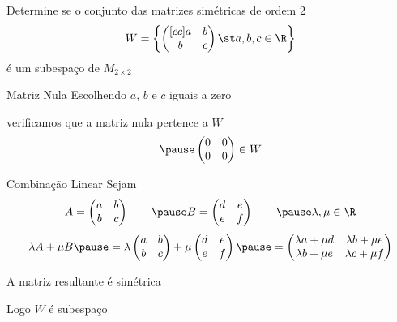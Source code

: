 \begin{question}
  Determine se o conjunto das matrizes simétricas de ordem 2
  \[
    W=
    \left\{
    \begin{pmatrix}[cc]
      a & b \\
      b & c
    \end{pmatrix}
    \st
    a, b, c \in \R
    \right\}
  \]
  é um subespaço de $M_{2\times2}$
\end{question}

\begin{resolution}{Matriz Nula}
  Escolhendo $a$, $b$ e $c$ iguais a zero

  \pause
  verificamos que a matriz nula pertence a $W$
  \[
    \pause
    \begin{pmatrix}
      0 & 0 \\
      0 & 0
    \end{pmatrix}
    \in W
  \]
\end{resolution}

\begin{resolution}{Combinação Linear}
  Sejam
  \[
    A =
    \begin{pmatrix}
      a & b \\
      b & c
    \end{pmatrix}
    \qquad
    \pause
    B =
    \begin{pmatrix}
      d & e \\
      e & f
    \end{pmatrix}
    \qquad
    \pause
    \lambda, \mu\in\R
  \]
  \pause
  \[
    \lambda A + \mu B
    \pause
    = \lambda
    \begin{pmatrix}
      a & b \\
      b & c
    \end{pmatrix}
    + \mu
    \begin{pmatrix}
      d & e \\
      e & f
    \end{pmatrix}
    \pause
    =
    \begin{pmatrix}
      \lambda a+\mu d & \lambda b+\mu e \\
      \lambda b+\mu e & \lambda c+\mu f
    \end{pmatrix}
  \]

  \pause
  A matriz resultante é simétrica

  \pause
  Logo $W$ é subespaço
\end{resolution}

\endinput

